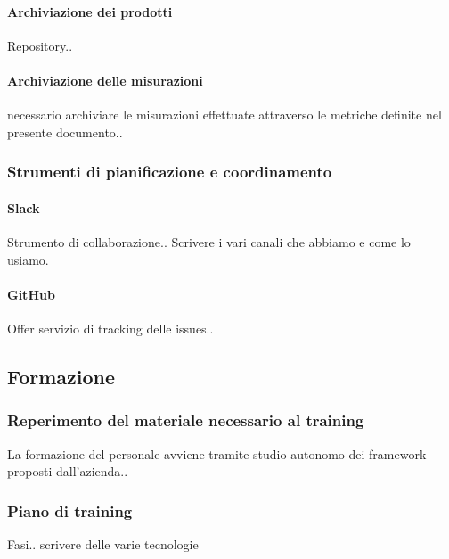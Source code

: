     		\paragraph{Archiviazione dei prodotti}
    		Repository..
    		
    		\paragraph{Archiviazione delle misurazioni}
    		necessario archiviare le misurazioni effettuate attraverso le metriche definite nel presente documento..
    		
    	\subsubsection{Strumenti di pianificazione e coordinamento}
    	
    		\paragraph{Slack} %
    		Strumento di collaborazione..
    		Scrivere i vari canali che abbiamo e come lo usiamo.
    		
    		\paragraph{GitHub}
    		Offer servizio di tracking delle issues..
    		

			
	
	\subsection{Formazione}		
	
		\subsubsection{Reperimento del materiale necessario al training}
		La formazione del personale avviene tramite studio autonomo dei framework proposti dall'azienda..
		
		\subsubsection{Piano di training}
		Fasi..
		scrivere delle varie tecnologie
		
    
    
    
    

